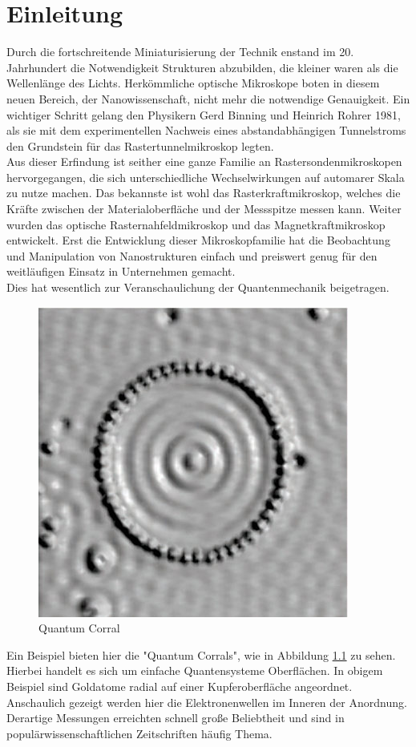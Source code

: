 \chapter{Einleitung}

Durch die fortschreitende Miniaturisierung der Technik enstand im 20. Jahrhundert
die Notwendigkeit Strukturen abzubilden, die kleiner waren als die Wellenlänge des
Lichts. Herkömmliche optische Mikroskope boten in diesem neuen Bereich, der 
Nanowissenschaft, nicht mehr die notwendige Genauigkeit. Ein wichtiger Schritt
gelang den Physikern Gerd Binning und Heinrich Rohrer 1981, als sie mit dem 
experimentellen Nachweis eines abstandabhängigen Tunnelstroms den Grundstein für
das Rastertunnelmikroskop legten.\\
Aus dieser Erfindung ist seither eine ganze Familie an Rastersondenmikroskopen
hervorgegangen, die sich unterschiedliche Wechselwirkungen auf automarer Skala
zu nutze machen. Das bekannste ist wohl das Rasterkraftmikroskop, welches die 
Kräfte zwischen der Materialoberfläche und der Messspitze messen kann. Weiter
wurden das optische Rasternahfeldmikroskop und das Magnetkraftmikroskop entwickelt.
Erst die Entwicklung dieser Mikroskopfamilie hat die Beobachtung und Manipulation
von Nanostrukturen einfach und preiswert genug für den weitläufigen Einsatz in 
Unternehmen gemacht.\\
Dies hat wesentlich zur Veranschaulichung der Quantenmechanik beigetragen.
\begin{figure}
    \includegraphics[scale=1.25]{Abb/quant.jpg}
    \caption{Quantum Corral}
    \label{qucorr}
\end{figure}
Ein Beispiel bieten hier die "Quantum Corrals", wie in Abbildung \ref{qucorr} zu
sehen. Hierbei handelt es sich um einfache Quantensysteme Oberflächen. In obigem
Beispiel sind Goldatome radial auf einer Kupferoberfläche angeordnet. Anschaulich
gezeigt werden hier die Elektronenwellen im Inneren der Anordnung.
Derartige Messungen erreichten schnell große Beliebtheit und sind in 
populärwissenschaftlichen Zeitschriften häufig Thema.
% 
